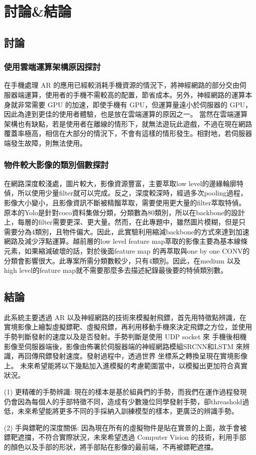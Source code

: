 \chapter{討論\&結論}
\section{討論}
\subsection{使用雲端運算架構原因探討}
在手機處理 AR 的應用已經較消耗手機資源的情況下，將神經網路的部分交由伺服器端運算，使用者的手機不需較高的配置，節省成本。另外，神經網路的運算本身就非常需要 GPU 的加速，即使手機有 GPU，但運算量遠小於伺服器的 GPU，因此為達到更佳的使用者體驗，也是放在雲端運算的原因之一。
當然在雲端運算架構也有缺點，若是使用者在離線的情形下，就無法遊玩此遊戲，不過在現在網路覆蓋率極高，相信在大部分的情況下，不會有這樣的情形發生。相對地，若伺服器端發生故障，則無法使用。
\subsection{物件較大影像的類別個數探討}
在網路深度較淺處，圖片較大，影像資源豐富，主要萃取low level的邊緣輪廓特偵，所以使用少量filter就可以完成。反之，深度較深時，經過多次pooling過程，影像大小變小，且影像資訊不斷被精餾萃取，需要使用更大量的filter萃取特偵。原本的Yolo是針對coco資料集做分類，分類數為80類別，所以在backbone的設計上，每層的filter需要更深、更大量。然而，在此專題中，雖然圖片模糊，但是只需要分為4類別，且物件偏大。因此，此實驗利用縮減backbone的方式來達到加速網路及減少浮點運算。越前層的low level feature map萃取的影像主要為基本線條元素，如果縮減破壞的話，對於後面feature map 的再萃取與one by one CONV的分類會影響很大。此專案所需分類數較少，只有4類別。因此，在medium 以及high level的feature map就不需要那麼多去描述紀錄最後要的特偵類別數。

\section{結論}
此系統主要透過 AR 以及神經網路的技術來模擬射飛鏢，首先用特徵點辨識，在實境影像上繪製虛擬鏢靶、虛擬飛鏢，再利用移動手機來決定飛鏢之方位，並使用手勢判斷發射的速度以及是否發射。手勢判斷是使用 UDP socket 來
手機後相機影像至伺服器端後，影像由佈署於伺服器端的神經網路模組SRCNN和LSTM 來辨識，再回傳飛鏢發射速度。發射過程中，透過世界
坐標系之轉換呈現在實境影像上。
未來希望能將以下幾點加入進模擬的考慮範圍當中，以模擬出更加符合真實狀況。

(1) 更精確的手勢辨識: 現在的樣本是基於組員們的手勢，而我們在運作過程發現仍會因為每個人的手部特徵不同，造成有少數幾位同學發射手勢，卻threashold過低，未來希望能將更多不同的手採納入訓練模型的樣本，更廣泛的辨識手勢。

(2) 手與鏢靶的深度關係: 因為現在所有的虛擬物件是貼在實景的上面，故手會被鏢靶遮擋，不符合實際狀況，未來希望透過 Computer Vision 的技術，利用手部的顏色以及手部的形狀，將手部貼在影像的最前端，不再被鏢靶遮擋。
